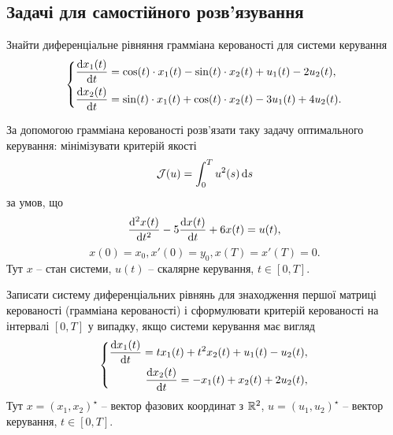 \subsection{Задачі для самостійного розв'язування}

\begin{problem}
    Знайти диференціальне рівняння грамміана керованості для системи керування \[ \left\{ \begin{aligned}
        \frac{\mathop{}\!\mathrm{d} x_1 (t)}{\mathop{}\!\mathrm{d} t} &= \cos(t) \cdot x_1(t)-\sin(t) \cdot x_2(t) + u_1(t) - 2 u_2(t), \\
        \frac{\mathop{}\!\mathrm{d} x_2 (t)}{\mathop{}\!\mathrm{d} t} &= \sin(t) \cdot x_1(t)+\cos(t) \cdot x_2(t) - 3 u_1(t) + 4 u_2(t).
    \end{aligned} \right. \]
\end{problem}

\begin{problem}
    За допомогою грамміана керованості розв'язати таку задачу оптимального керування: мінімізувати критерій якості \[ \mathcal{J} (u) = \int_0^T u^2(s) \mathop{}\!\mathrm{d} s \] за умов, що \[ \frac{\mathop{}\!\mathrm{d}^2 x(t)}{\mathop{}\!\mathrm{d} t^2} - 5 \frac{\mathop{}\!\mathrm{d} x(t)}{\mathop{}\!\mathrm{d} t} + 6 x(t) = u(t), \] \[ x(0) = x_0, x'(0) = y_0,x(T)=x'(T)=0.\] Тут $x$ -- стан системи, $u(t)$ -- скалярне керування, $t\in[0,T]$.
\end{problem}

\begin{problem}
    Записати систему диференціальних рівнянь для знаходження першої матриці керованості (грамміана керованості) і сформулювати критерій керованості на інтервалі $[0,T]$ у випадку, якщо системи керування має вигляд \[ \left\{ \begin{aligned} \frac{\mathop{}\!\mathrm{d} x_1(t)}{\mathop{}\!\mathrm{d} t} = tx_1(t) + t^2x_2(t) + u_1(t)-u_2(t), \\ \frac{\mathop{}\!\mathrm{d} x_2(t)}{\mathop{}\!\mathrm{d} t} = -x_1(t) + x_2(t) + 2u_2(t), \end{aligned} \right. \] Тут $x = (x_1, x_2)^\star$ -- вектор фазових координат з $\mathbb{R}^2$, $u=(u_1,u_2)^\star$ -- вектор керування, $t \in [0, T]$.
\end{problem}

